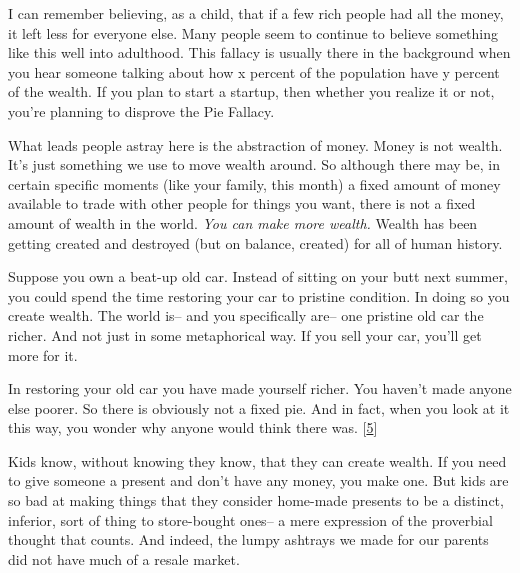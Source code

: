 I can
                    remember believing, as a child, that if a few rich people
                    had all the money, it left less for everyone else. Many
                    people seem to continue to believe something like this well
                    into adulthood. This fallacy is usually there in the
                    background when you hear someone talking about how x percent
                    of the population have y percent of the wealth. If you plan
                    to start a startup, then whether you realize it or not,
                    you're planning to disprove the Pie Fallacy.

What
                    leads people astray here is the abstraction of money. Money
                    is not wealth. It's just something we use to move wealth
                    around. So although there may be, in certain specific
                    moments (like your family, this month) a fixed amount of
                    money available to trade with other people for things you
                    want, there is not a fixed amount of wealth in the world.
                    \emph{You can make more wealth.} Wealth has been getting
                    created and destroyed (but on balance, created) for all of
                    human history.

Suppose you own a beat-up old car.
                    Instead of sitting on your butt next summer, you could spend
                    the time restoring your car to pristine condition. In doing
                    so you create wealth. The world is-- and you specifically
                    are-- one pristine old car the richer. And not just in some
                    metaphorical way. If you sell your car, you'll get more for
                    it.

In restoring your old car you have made
                    yourself richer. You haven't made anyone else poorer. So
                    there is obviously not a fixed pie. And in fact, when you
                    look at it this way, you wonder why anyone would think there
                    was.
                    [\href{\#f5n}{5}]

Kids know, without knowing they know, that they
                    can create wealth. If you need to give someone a present and
                    don't have any money, you make one. But kids are so bad at
                    making things that they consider home-made presents to be a
                    distinct, inferior, sort of thing to store-bought ones-- a
                    mere expression of the proverbial thought that counts. And
                    indeed, the lumpy ashtrays we made for our parents did not
                    have much of a resale market.

